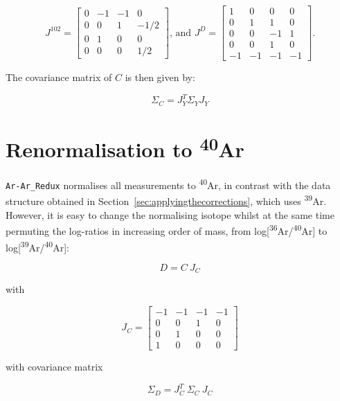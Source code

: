 \documentclass{article}
\begin{document}
\begin{equation}
  J^{102} = \left[
    \begin{array}{cccc}
      0 & -1 & -1 & 0 \\
      0 & 0 & 1 & -1/2 \\
      0 & 1 & 0 & 0 \\
      0 & 0 & 0 & 1/2
    \end{array}
    \right]
  \mbox{, and~}
  J^{D} = \left[
    \begin{array}{cccc}
       1 & 0 & 0 & 0  \\
       0 & 1 & 1 & 0  \\
       0 & 0 & -1 & 1 \\
       0 & 0 & 1 & 0  \\
       -1 & -1 & -1 & -1
    \end{array}
    \right].  
\end{equation}

The covariance matrix of $C$ is then given by:

\begin{equation}
\Sigma_{C} = J_Y^T \Sigma_Y J_Y
\end{equation}


\section{Renormalisation to \textsuperscript{40}Ar}

\texttt{Ar-Ar\_Redux} normalises all measurements to
\textsuperscript{40}Ar, in contrast with the data structure obtained
in Section~\ref{sec:applyingthecorrections}, which uses
\textsuperscript{39}Ar. However, it is easy to change the normalising
isotope whilst at the same time permuting the log-ratios in increasing
order of mass, from log[\textsuperscript{36}Ar/\textsuperscript{40}Ar]
to log[\textsuperscript{39}Ar/\textsuperscript{40}Ar]:

\[
D = C ~ J_C
\]

with

\[
J_C = \left[
  \begin{array}{cccc}
    -1 & -1 & -1 & -1 \\
    0 & 0 & 1 & 0 \\
    0 & 1 & 0 & 0 \\
    1 & 0 & 0 & 0
  \end{array}
  \right]
\]

\noindent with covariance matrix 

\begin{equation}
\Sigma_{D} = J_C^T ~ \Sigma_{C} ~ J_C
\end{equation}
\end{document}
